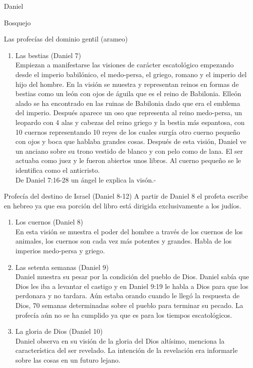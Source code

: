 \begin{section}{Daniel}
\begin{subsection}{Bosquejo}
\begin{subsubsection}{Las profecías del dominio gentil (arameo)}
\begin{enumerate}
					\newpage
				\item Las bestias (Daniel 7)\\
					Empiezan a manifestarse las visiones de carácter escatológico empezando desde el imperio babilónico, el medo-persa, el griego, romano y el imperio del hijo del hombre. En la visión se muestra y representan reinos en formas de bestias como un león con ojos de águila que es el reino de Babilonia. Elleón alado se ha encontrado en las ruinas de Babilonia dado que era el emblema del imperio. Después aparece un oso que representa al reino medo-persa, un leopardo con 4 alas y cabezas del reino griego y la bestia más espantosa, con 10 cuernos representando 10 reyes de los cuales surgía otro cuerno pequeño con ojos y boca que hablaba grandes cosas. Después de esta visión, Daniel ve un anciano sobre su trono vestido de blanco y con pelo como de lana. El ser actuaba como juez y le fueron abiertos unos libros. Al cuerno pequeño se le identifica como el anticristo.\\
De Daniel 7:16-28 un ángel le explica la visón.-
			\end{enumerate}
		\end{subsubsection}
		\begin{subsubsection}{Profecía del destino de Israel (Daniel 8-12)}
			A partir de Daniel 8 el profeta escribe en hebreo ya que esa porción del libro está dirigida exclusivamente a los judíos.
			\begin{enumerate}
				\item Los cuernos (Daniel 8)\\
					En esta visión se muestra el poder del hombre a través de los cuernos de los animales, los cuernos son cada vez más potentes y grandes. Habla de los imperios medo-persa y griego.
				\item Las setenta semanas (Daniel 9)\\
					Daniel muestra su pesar por la condición del pueblo de Dios. Daniel sabía que Dios les iba a levantar el castigo y en Daniel 9:19 le habla a Dios para que los perdonara y no tardara. Aún estaba orando cuando le llegó la respuesta de Dios, 70 semanas determinadas sobre el pueblo para terminar su pecado. La profecía aún no se ha cumplido ya que es para los tiempos escatológicos.
				\item La gloria de Dios (Daniel 10)\\
					Daniel observa en su visión de la gloria del Dios altísimo, menciona la característica del ser revelado. La intención de la revelación era informarle sobre las cosas en un futuro lejano.

\end{enumerate}
\end{subsubsection}
\end{subsection}
\end{section}
